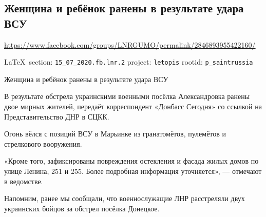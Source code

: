  
 

\subsection{Женщина и ребёнок ранены в результате удара ВСУ}
\label{sec:15_07_2020.fb.lnr.2}
\url{https://www.facebook.com/groups/LNRGUMO/permalink/2846893955422160/}


\cite{15_07_2020.fb.lnr.2}
  
\vspace{0.5cm}
{\ifDEBUG\small\LaTeX~section: \verb|15_07_2020.fb.lnr.2| project: \verb|letopis| rootid: \verb|p_saintrussia|\fi
}
\vspace{0.5cm}

Женщина и ребёнок ранены в результате удара ВСУ

В результате обстрела украинскими военными посёлка Александровка ранены двое
мирных жителей, передаёт корреспондент «Донбасс Сегодня» со ссылкой на
Представительство ДНР в СЦКК.

Огонь вёлся с позиций ВСУ в Марьинке из гранатомётов, пулемётов и стрелкового
вооружения.

«Кроме того, зафиксированы повреждения остекления и фасада жилых домов по улице
Ленина, 251 и 255. Более подробная информация уточняется», --- отмечают в
ведомстве.

Напомним, ранее мы сообщали, что военнослужащие ЛНР расстреляли двух украинских
бойцов за обстрел посёлка Донецкое.
  
